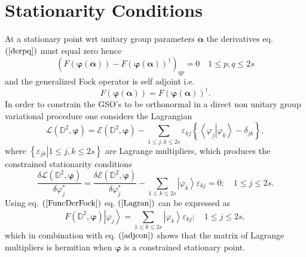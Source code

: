 \documentclass[aps,preprint]{revtex4}%
\begin{document}
\section{Stationarity Conditions\label{StatCon}}

At a stationary point wrt unitary group parameters $\bm{\alpha}$ the
derivatives eq. $\left(  \ref{derpq}\right)  $ must equal zero hence
\begin{equation}
\left(  F\left(  \bm{\varphi}\left(  \bm{\alpha}\right)  \right)  -F\left(
\bm{\varphi}\left(  \bm{\alpha}\right)  \right)  ^{\dagger}\right)
_{qp}=0\quad1\leq p,q\leq2s
\end{equation}
and the generalized Fock operator is self adjoint i.e.
\begin{equation}
F\left(  \bm{\varphi}\left(  \bm{\alpha}\right)  \right)  =F\left(
\bm{\varphi}\left(  \bm{\alpha}\right)  \right)  ^{\dagger}. \label{adjcon}%
\end{equation}
In order to constrain the GSO's to be orthonormal in a direct non unitary
group variational procedure one considers the Lagrangian
\begin{equation}
\mathcal{L}\left(  \mathbb{D}^{2},\bm{\varphi}\right)  =\mathcal{E}\left(
\mathbb{D}^{2},\bm{\varphi}\right)  -\sum_{1\leq j,k\leq2s}\varepsilon
_{kj}\left\{  \left\langle \left.  \varphi_{j}\right\vert \varphi
_{k}\right\rangle -\delta_{jk}\right\}  ,
\end{equation}
where $\left\{  \left.  \varepsilon_{jk}\right\vert 1\leq j,k\leq2s\right\}  $
are Lagrange multipliers, which produces the constrained stationarity
conditions
\begin{equation}
\frac{\delta\mathcal{L}\left(  \mathbb{D}^{2},\bm{\varphi}\right)  }%
{\delta\varphi_{j}^{\ast}}=\frac{\delta\mathcal{E}\left(  \mathbb{D}%
^{2},\bm{\varphi}\right)  }{\delta\varphi_{j}^{\ast}}-\sum_{1\leq k\leq
2s}\left\vert \varphi_{k}\right\rangle \varepsilon_{kj}=0;\quad1\leq j\leq2s.
\label{Lagran}%
\end{equation}
Using eq. $\left(  \ref{FuncDerFock}\right)  $ eq. $\left(  \ref{Lagran}%
\right)  $ can be expressed as
\begin{equation}
F\left(  \mathbb{D}^{2},\bm{\varphi}\right)  \left\vert \varphi_{j}%
\right\rangle =\sum_{1\leq k\leq2s}\left\vert \varphi_{k}\right\rangle
\varepsilon_{kj};\quad1\leq j\leq2s,
\end{equation}
which in combination with eq. $\left(  \ref{adjcon}\right)  $ shows that the
matrix of Lagrange multipliers is hermitian when $\bm{\varphi}$ is a
constrained stationary point.
\end{document}
